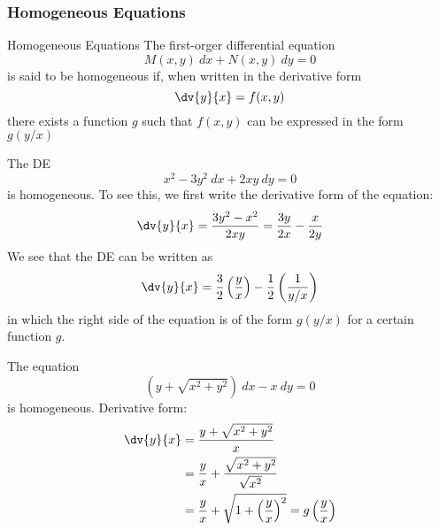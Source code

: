 
\subsubsection{Homogeneous Equations}

\begin{definition}{Homogeneous Equations}{}
    The first-orger differential equation \[
        M(x,y) \: d{x} + N(x,y) \: d{y} = 0
    \] is said to be homogeneous if, when written in the derivative form \[
        \dv{y}{x} = f(x,y)
    \] there exists a function $g$ such that $f(x,y)$ can be expressed in the form $g(y/x)$
\end{definition}

\begin{example}{}{}
    The DE \[
        x^2 - 3y^2 \: d{x} + 2xy \: d{y} = 0
    \] is homogeneous. To see this, we first write the derivative form of the equation: \[
        \dv{y}{x} = \frac{3y^2 - x^2}{2xy} = \frac{3y}{2x} - \frac{x}{2y}
    \] We see that the DE can be written as \[
        \dv{y}{x} = \frac{3}{2} \left( \frac{y}{x} \right) - \frac{1}{2} \left( \frac{1}{y/x} \right) 
    \] in which the right side of the equation is of the form $g(y/x)$ for a certain function $g$.
\end{example}

\begin{example}{The equation \[
        (y + \sqrt{x^2 + y^2}) \: d{x} - x \: d{y} = 0
\] is homogeneous.}{}
    Derivative form:
    \begin{align*}
        \dv{y}{x} &= \frac{y + \sqrt{x^2 + y^2}}{x} \\
        &= \frac{y}{x} + \frac{\sqrt{x^2 + y^2}}{\sqrt{x^2}} \\
        &= \frac{y}{x} + \sqrt{1 + \left( \frac{y}{x} \right)^2} = g\left( \frac{y}{x} \right) \\
    \end{align*}
\end{example}

